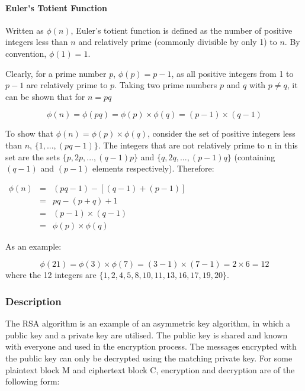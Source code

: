 \documentclass[a4paper,12pt]{report}
\begin{document}
\paragraph{Euler's Totient Function}

Written as $\phi(n)$, Euler's totient function is defined as the number of positive integers less than $n$ and relatively prime (commonly divisible by only 1) to $n$. By convention, $\phi(1) = 1$. 

Clearly, for a prime number $p$, $\phi(p) = p - 1$, as all positive integers from 1 to $p - 1$ are relatively prime to $p$. Taking two prime numbers $p$ and $q$ with $p \neq q$, it can be shown that for $n = pq$

\[\phi(n) = \phi(pq) = \phi(p) \times \phi(q) = (p - 1) \times (q - 1) \]

To show that $\phi(n) = \phi(p) \times \phi(q)$, consider the set of positive integers less than $n$, $\{1, ..., (pq - 1)\}$. The integers that are not relatively prime to n in this set are the sets $\{p,2p, ..., (q - 1)p\}$ and $\{q,2q, ..., (p - 1)q\}$ (containing $(q - 1)$ and $(p - 1)$ elements respectively). Therefore:

\begin{center}
$\begin{array}{lcl} \phi(n) & = & (pq - 1) - [(q - 1) + (p - 1)] \\  
			    & = & pq - (p + q) + 1 \\
			    & = & (p - 1) \times (q - 1) \\
			    & = & \phi(p) \times \phi(q) 
\end{array}$
\end{center}

As an example:

\[ \phi(21) = \phi(3) \times \phi(7) = (3 - 1) \times (7 - 1) = 2 \times 6 = 12 \]
where the 12 integers are $\{1,2,4,5,8,10,11,13,16,17,19,20\}$.

\subsubsection{Description}

The RSA algorithm is an example of an asymmetric key algorithm, in which a public key and a private key are utilised. The public key is shared and known with everyone and used in the encryption process. The messages encrypted with the public key can only be decrypted using the matching private key. For some plaintext block M and ciphertext block C, encryption and decryption are of the following form: 
\end{document}
